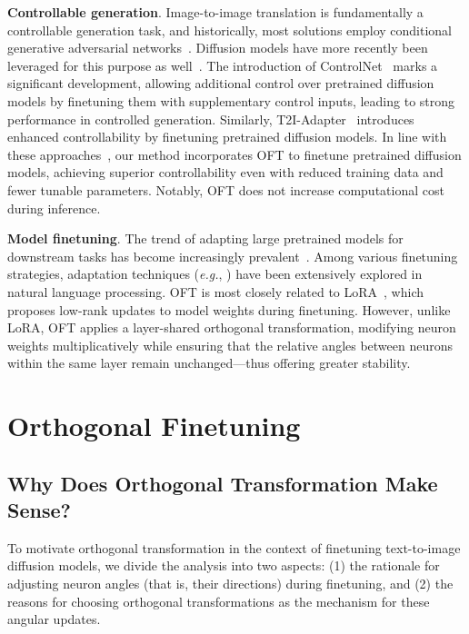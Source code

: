 \textbf{Controllable generation}. Image-to-image translation is fundamentally a controllable generation task, and historically, most solutions employ conditional generative adversarial networks~\cite{isola2017image,zhu2017toward,wang2018high,park2019semantic,choi2018stargan}. Diffusion models have more recently been leveraged for this purpose as well~\cite{saharia2022palette,voynov2022sketch,wang2022pretraining}. The introduction of ControlNet~\cite{zhang2023adding} marks a significant development, allowing additional control over pretrained diffusion models by finetuning them with supplementary control inputs, leading to strong performance in controlled generation. Similarly, T2I-Adapter~\cite{mou2023t2i} introduces enhanced controllability by finetuning pretrained diffusion models. In line with these approaches~\cite{zhang2023adding,mou2023t2i}, our method incorporates OFT to finetune pretrained diffusion models, achieving superior controllability even with reduced training data and fewer tunable parameters. Notably, OFT does not increase computational cost during inference.

\textbf{Model finetuning}. The trend of adapting large pretrained models for downstream tasks has become increasingly prevalent~\cite{devlin2018bert,brown2020language,he2022masked}. Among various finetuning strategies, adaptation techniques (\emph{e.g.}, \cite{hulora2022,houlsby2019parameter,pfeiffer2020adapterfusion}) have been extensively explored in natural language processing. OFT is most closely related to LoRA~\cite{hulora2022}, which proposes low-rank updates to model weights during finetuning. However, unlike LoRA, OFT applies a layer-shared orthogonal transformation, modifying neuron weights multiplicatively while ensuring that the relative angles between neurons within the same layer remain unchanged—thus offering greater stability.

\section{Orthogonal Finetuning}

\subsection{Why Does Orthogonal Transformation Make Sense?}

To motivate orthogonal transformation in the context of finetuning text-to-image diffusion models, we divide the analysis into two aspects: (1) the rationale for adjusting neuron angles (that is, their directions) during finetuning, and (2) the reasons for choosing orthogonal transformations as the mechanism for these angular updates.

